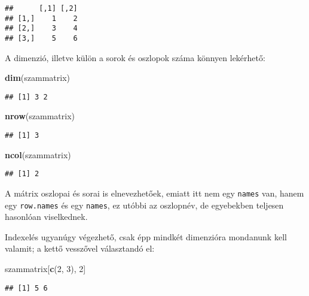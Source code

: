 \documentclass[]{book}
\newenvironment{Shaded}{\begin{snugshade}}{\end{snugshade}}
\newcommand{\DecValTok}[1]{\textcolor[rgb]{0.00,0.00,0.81}{#1}}
\newcommand{\KeywordTok}[1]{\textcolor[rgb]{0.13,0.29,0.53}{\textbf{#1}}}
\newcommand{\NormalTok}[1]{#1}
\begin{document}
\begin{verbatim}
##      [,1] [,2]
## [1,]    1    2
## [2,]    3    4
## [3,]    5    6
\end{verbatim}

A dimenzió, illetve külön a sorok és oszlopok száma könnyen lekérhető:

\begin{Shaded}
\begin{Highlighting}[]
\KeywordTok{dim}\NormalTok{(szammatrix)}
\end{Highlighting}
\end{Shaded}

\begin{verbatim}
## [1] 3 2
\end{verbatim}

\begin{Shaded}
\begin{Highlighting}[]
\KeywordTok{nrow}\NormalTok{(szammatrix)}
\end{Highlighting}
\end{Shaded}

\begin{verbatim}
## [1] 3
\end{verbatim}

\begin{Shaded}
\begin{Highlighting}[]
\KeywordTok{ncol}\NormalTok{(szammatrix)}
\end{Highlighting}
\end{Shaded}

\begin{verbatim}
## [1] 2
\end{verbatim}

A mátrix oszlopai és sorai is elnevezhetőek, emiatt itt nem egy \texttt{names} van, hanem egy \texttt{row.names} és egy \texttt{names}, ez utóbbi az oszlopnév, de egyebekben teljesen hasonlóan viselkednek.

Indexelés ugyanúgy végezhető, csak épp mindkét dimenzióra mondanunk kell valamit; a kettő vesszővel választandó el:

\begin{Shaded}
\begin{Highlighting}[]
\NormalTok{szammatrix[}\KeywordTok{c}\NormalTok{(}\DecValTok{2}\NormalTok{, }\DecValTok{3}\NormalTok{), }\DecValTok{2}\NormalTok{]}
\end{Highlighting}
\end{Shaded}

\begin{verbatim}
## [1] 5 6
\end{verbatim}
\end{document}
